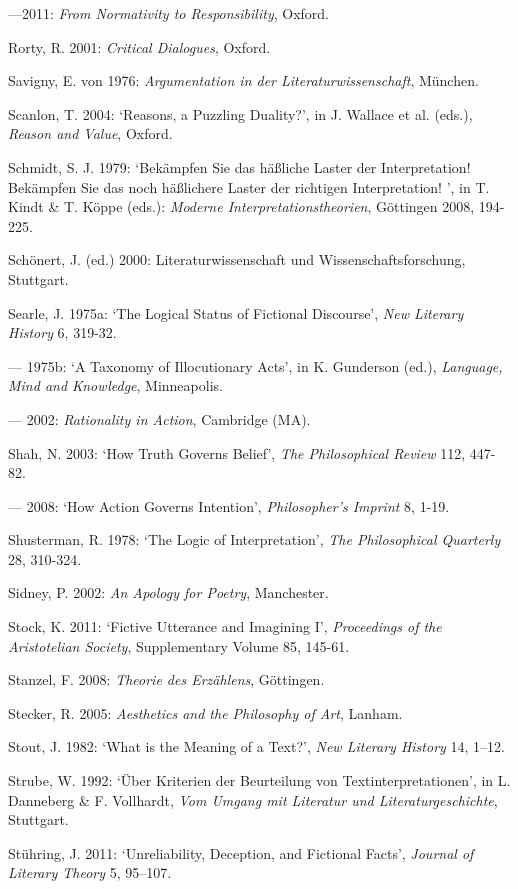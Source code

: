 \begin{hangparas}{.5cm}{1}
---2011: \emph{From Normativity to Responsibility}, Oxford. 

Rorty, R. 2001: \emph{Critical Dialogues}, Oxford.

Savigny, E. von 1976: \emph{Argumentation in der Literaturwissenschaft}, M\"unchen.

Scanlon, T. 2004: `Reasons, a Puzzling Duality?', in J. Wallace et al. (eds.), \emph{Reason and Value}, Oxford.

Schmidt, S. J. 1979: `Bek\"ampfen Sie das h\"a{\ss}liche Laster der Interpretation! Bek\"ampfen Sie das noch h\"a{\ss}lichere Laster der richtigen Interpretation! ', in T. Kindt \& T. K\"oppe (eds.): \emph{Moderne Interpretationstheorien}, G\"ottingen 2008, 194-225.

Sch\"onert, J. (ed.) 2000: Literaturwissenschaft und Wissenschaftsforschung, Stuttgart.

Searle, J. 1975a: `The Logical Status of Fictional Discourse', \emph{New Literary History} 6, 319-32.

--- 1975b: `A Taxonomy of Illocutionary Acts', in K. Gunderson (ed.), \emph{Language, Mind and Knowledge}, Minneapolis.

--- 2002: \emph{Rationality in Action}, Cambridge (MA). 

Shah, N. 2003: `How Truth Governs Belief', \emph{The Philosophical Review} 112, 447-82.

--- 2008: `How Action Governs Intention', \emph{Philosopher's Imprint} 8, 1-19.

Shusterman, R. 1978: `The Logic of Interpretation', \emph{The Philosophical Quarterly} 28, 310-324.

Sidney, P. 2002: \emph{An Apology for Poetry}, Manchester.

Stock, K. 2011: `Fictive Utterance and Imagining I', \emph{Proceedings of the Aristotelian Society}, Supplementary Volume 85, 145-61.

Stanzel, F. 2008: \emph{Theorie des Erz\"ahlens}, G\"ottingen. 

Stecker, R. 2005: \emph{Aesthetics and the Philosophy of Art}, Lanham.

Stout, J. 1982: `What is the Meaning of a Text?', \emph{New Literary History} 14, 1--12.

Strube, W. 1992: `\"Uber Kriterien der Beurteilung von Textinterpretationen', in L. Danneberg \& F. Vollhardt, \emph{Vom Umgang mit Literatur und Literaturgeschichte}, Stuttgart.

St\"uhring, J. 2011: `Unreliability, Deception, and Fictional Facts', \emph{Journal of Literary Theory} 5, 95--107.


\end{hangparas}
